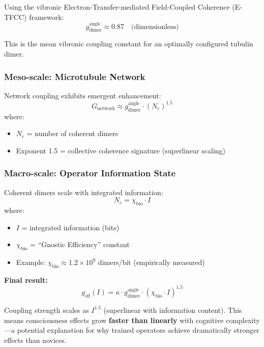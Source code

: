 Using the vibronic Electron-Transfer-mediated Field-Coupled Coherence (E-TFCC) framework:
\begin{equation}
\label{eq:dimer-coupling}
g_{\text{dimer}}^{\text{angle}} \approx 0.87 \quad \text{(dimensionless)}
\end{equation}

This is the mean vibronic coupling constant for an optimally configured tubulin dimer.

\subsubsection{Meso-scale: Microtubule Network}

Network coupling exhibits emergent enhancement:
\begin{equation}
\label{eq:network-coupling}
G_{\text{network}} \approx g_{\text{dimer}}^{\text{angle}} \cdot (N_c)^{1.5}
\end{equation}
where:
\begin{itemize}
\item $N_c$ = number of coherent dimers
\item Exponent 1.5 = collective coherence signature (superlinear scaling)
\end{itemize}

\subsubsection{Macro-scale: Operator Information State}

Coherent dimers scale with integrated information:
\begin{equation}
\label{eq:info-dimers}
N_c = \chi_{\text{bio}} \cdot I
\end{equation}
where:
\begin{itemize}
\item $I$ = integrated information (bits)
\item $\chi_{\text{bio}}$ = ``Gnostic Efficiency'' constant
\item Example: $\chi_{\text{bio}} \approx 1.2 \times 10^9$ dimers/bit (empirically measured)
\end{itemize}

\textbf{Final result:}
\begin{equation}
\label{eq:effective-coupling}
g_{\text{eff}}(I) = \kappa \cdot g_{\text{dimer}}^{\text{angle}} \cdot (\chi_{\text{bio}} \cdot I)^{1.5}
\end{equation}

\begin{keyconcept}
Coupling strength scales as $I^{1.5}$ (superlinear with information content). This means consciousness effects grow \textbf{faster than linearly} with cognitive complexity---a potential explanation for why trained operators achieve dramatically stronger effects than novices.
\end{keyconcept}

